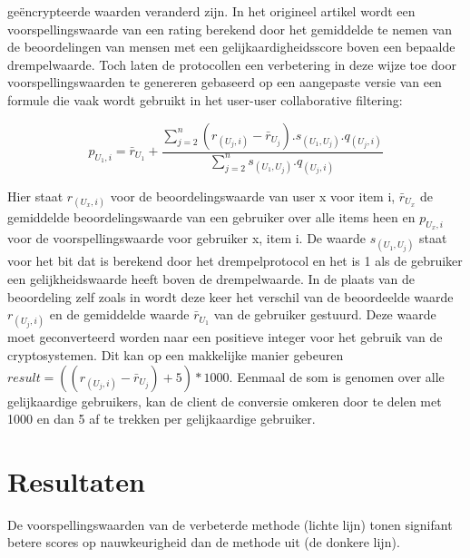 \documentclass[twocolumn]{phdsymp} %
\begin{document}
ge\"encrypteerde waarden veranderd zijn. In het origineel artikel \cite{dyn} wordt een voorspellingswaarde van een rating berekend door het gemiddelde te nemen van de beoordelingen van mensen met een gelijkaardigheidsscore boven een bepaalde drempelwaarde. Toch laten de protocollen een verbetering in deze wijze toe door voorspellingswaarden te genereren gebaseerd op een aangepaste versie van een formule die vaak wordt gebruikt in het user-user collaborative filtering:

\begin{equation}\label{stdrecom}p_{U_1,i} = \bar{r}_{U_1} + \frac{\sum_{j=2}^{n}(r_{(U_j,i)} - \bar{r}_{U_j}).s_{(U_1,U_j)}.q_{(U_j,i)}}{\sum_{j=2}^{n} s_{(U_1,U_j)}.q_{(U_j,i)} }
\end{equation}

Hier staat $r_{(U_x,i)}$ voor de beoordelingswaarde van user x voor item i, $\bar{r}_{U_x}$ de gemiddelde beoordelingswaarde van een gebruiker over alle items heen en $p_{U_x,i}$ voor de voorspellingswaarde voor gebruiker x, item i.
De waarde $s_{(U_1,U_j)}$ staat voor het bit dat is berekend door het drempelprotocol en het is 1 als de gebruiker een gelijkheidswaarde heeft boven de drempelwaarde. In de plaats van de beoordeling zelf zoals in \cite{dyn} wordt deze keer het verschil van de beoordeelde waarde $r_{(U_j,i)}$ en de gemiddelde waarde $\bar{r}_{U_1}$ van de gebruiker gestuurd. Deze waarde moet geconverteerd worden naar een positieve integer voor het gebruik van de cryptosystemen. Dit kan op een makkelijke manier gebeuren $result = ((r_{(U_j,i)} - \bar{r}_{U_j})+5)*1000$. Eenmaal de som is genomen over alle gelijkaardige gebruikers, kan de client de conversie omkeren door te delen met 1000 en dan 5 af te trekken per gelijkaardige gebruiker.


\section{Resultaten}

De voorspellingswaarden van de verbeterde methode (lichte lijn) tonen signifant betere scores op nauwkeurigheid dan de methode uit \cite{dyn} (de donkere lijn).
\end{document}
